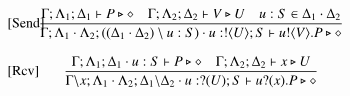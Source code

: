 \begin{figure}[t]
\[\begin{array}{lc}
		\trule{Send}& \hspace{-0.5cm}\tree{
			\Gamma; \Lambda_1; \Delta_1 \proves P \hastype \Proc
			\quad
			\Gamma; \Lambda_2; \Delta_2 \proves V \hastype U
			\quad
			u:S \in \Delta_1 \cat \Delta_2
		}{
			\Gamma; \Lambda_1 \cat \Lambda_2; ((\Delta_1 \cat \Delta_2) \setminus u:S) \cat u:\btout{U} S \proves \bout{u}{V} P \hastype \Proc
		}
		\\[6mm]

		\trule{Rcv}&\hspace{-0.5cm} \tree{
		\Gamma; \Lambda_1; \Delta_1 \cat u: S \proves P \hastype \Proc
			\quad
			\Gamma; \Lambda_2; \Delta_2 \proves {x} \hastype {U}
		}{
			\Gamma \backslash x; \Lambda_1\cat \Lambda_2; \Delta_1\backslash \Delta_2 \cat u: \btinp{U} S \vdash \binp{u}{{x}} P \hastype \Proc
		}
\\[6mm]




\end{array}\]
\end{figure}
